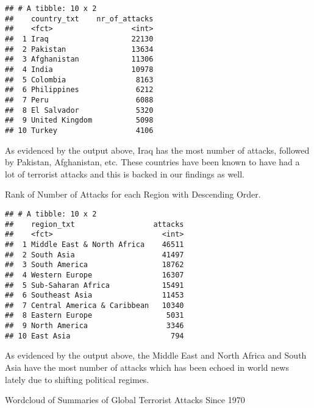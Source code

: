 \documentclass[11pt,letterpaper,]{article}
\newenvironment{Shaded}{\begin{snugshade}}{\end{snugshade}}
\newcommand{\KeywordTok}[1]{\textcolor[rgb]{0.13,0.29,0.53}{\textbf{{#1}}}}
\newcommand{\DataTypeTok}[1]{\textcolor[rgb]{0.13,0.29,0.53}{{#1}}}
\newcommand{\DecValTok}[1]{\textcolor[rgb]{0.00,0.00,0.81}{{#1}}}
\newcommand{\StringTok}[1]{\textcolor[rgb]{0.31,0.60,0.02}{{#1}}}
\newcommand{\NormalTok}[1]{{#1}}
\theoremstyle{definition}
\theoremstyle{definition}
\theoremstyle{definition}
\theoremstyle{remark}
\begin{document}
\begin{verbatim}
## # A tibble: 10 x 2
##    country_txt    nr_of_attacks
##    <fct>                  <int>
##  1 Iraq                   22130
##  2 Pakistan               13634
##  3 Afghanistan            11306
##  4 India                  10978
##  5 Colombia                8163
##  6 Philippines             6212
##  7 Peru                    6088
##  8 El Salvador             5320
##  9 United Kingdom          5098
## 10 Turkey                  4106
\end{verbatim}

As evidenced by the output above, Iraq has the most number of attacks,
followed by Pakistan, Afghanistan, etc. These countries have been known
to have had a lot of terrorist attacks and this is backed in our
findings as well.

Rank of Number of Attacks for each Region with Descending Order.

\begin{Shaded}
\end{Shaded}

\begin{verbatim}
## # A tibble: 10 x 2
##    region_txt                  attacks
##    <fct>                         <int>
##  1 Middle East & North Africa    46511
##  2 South Asia                    41497
##  3 South America                 18762
##  4 Western Europe                16307
##  5 Sub-Saharan Africa            15491
##  6 Southeast Asia                11453
##  7 Central America & Caribbean   10340
##  8 Eastern Europe                 5031
##  9 North America                  3346
## 10 East Asia                       794
\end{verbatim}

As evidenced by the output above, the Middle East and North Africa and
South Asia have the most number of attacks which has been echoed in
world news lately due to shifting political regimes.

Wordcloud of Summaries of Global Terrorist Attacks Since 1970
\end{document}
